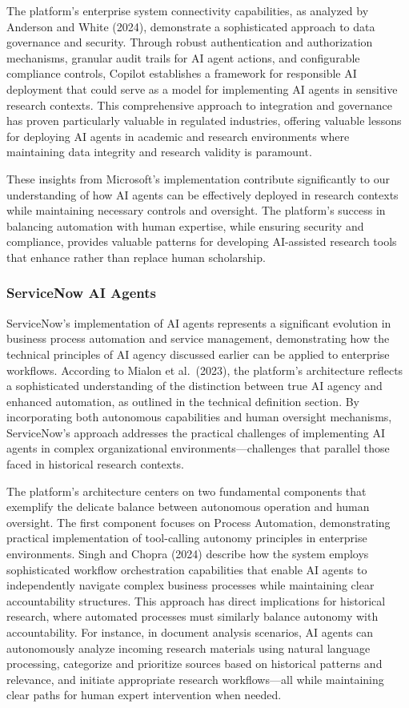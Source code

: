 \documentclass[
]{article}
\begin{document}
The platform's enterprise system connectivity capabilities, as analyzed
by Anderson and White (2024), demonstrate a sophisticated approach to
data governance and security. Through robust authentication and
authorization mechanisms, granular audit trails for AI agent actions,
and configurable compliance controls, Copilot establishes a framework
for responsible AI deployment that could serve as a model for
implementing AI agents in sensitive research contexts. This
comprehensive approach to integration and governance has proven
particularly valuable in regulated industries, offering valuable lessons
for deploying AI agents in academic and research environments where
maintaining data integrity and research validity is paramount.

These insights from Microsoft's implementation contribute significantly
to our understanding of how AI agents can be effectively deployed in
research contexts while maintaining necessary controls and oversight.
The platform's success in balancing automation with human expertise,
while ensuring security and compliance, provides valuable patterns for
developing AI-assisted research tools that enhance rather than replace
human scholarship.

\subsubsection{ServiceNow AI Agents}\label{servicenow-ai-agents}

ServiceNow's implementation of AI agents represents a significant
evolution in business process automation and service management,
demonstrating how the technical principles of AI agency discussed
earlier can be applied to enterprise workflows. According to Mialon et
al.~(2023), the platform's architecture reflects a sophisticated
understanding of the distinction between true AI agency and enhanced
automation, as outlined in the technical definition section. By
incorporating both autonomous capabilities and human oversight
mechanisms, ServiceNow's approach addresses the practical challenges of
implementing AI agents in complex organizational
environments---challenges that parallel those faced in historical
research contexts.

The platform's architecture centers on two fundamental components that
exemplify the delicate balance between autonomous operation and human
oversight. The first component focuses on Process Automation,
demonstrating practical implementation of tool-calling autonomy
principles in enterprise environments. Singh and Chopra (2024) describe
how the system employs sophisticated workflow orchestration capabilities
that enable AI agents to independently navigate complex business
processes while maintaining clear accountability structures. This
approach has direct implications for historical research, where
automated processes must similarly balance autonomy with accountability.
For instance, in document analysis scenarios, AI agents can autonomously
analyze incoming research materials using natural language processing,
categorize and prioritize sources based on historical patterns and
relevance, and initiate appropriate research workflows---all while
maintaining clear paths for human expert intervention when needed.
\end{document}
